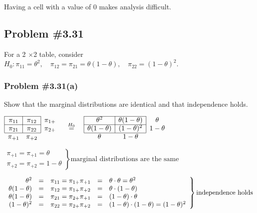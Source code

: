 \documentclass[12pt, letterpaper]{article}
\begin{document}
Having a cell with a value of 0 makes analysis difficult.  

\subsection*{Problem {\#}3.31}
For a 2 $\times$2 table, consider $H_0: \pi_{11} = \theta^2, \quad \pi_{12} = \pi_{21} = \theta(1 - \theta),\quad  \pi_{22} = (1 - \theta)^2$.  
\subsubsection*{Problem {\#}3.31(a)} 
Show that the marginal distributions are identical and that independence holds.  

$\begin{array}{ccc}
\cline{1-2} 
\multicolumn{1}{|c}{\pi_{11}} & \multicolumn{1}{|c|}{\pi_{12}}  & \pi_{1+} \\ \cline{1-2}
\multicolumn{1}{|c}{\pi_{21}} & \multicolumn{1}{|c|}{\pi_{22}}  & \pi_{2+} \\ \cline{1-2}
\pi_{+1} & \pi_{+2} & 
\end{array}
\quad 
\stackrel{H_0}{=}  \quad 
\begin{array}{ccc}
\cline{1-2} 
\multicolumn{1}{|c}{\theta^2} & \multicolumn{1}{|c|}{\theta(1 - \theta)}  & \theta \\ \cline{1-2}
\multicolumn{1}{|c}{\theta(1 - \theta) } & \multicolumn{1}{|c|}{(1- \theta)^2}  & 1 - \theta \\ \cline{1-2}
\theta & 1 - \theta & 
\end{array}$ 

$ \left. 
\begin{array}{l }
\pi_{+1} = \pi_{+1} = \theta \\
\pi_{+2} = \pi_{+2} = 1 - \theta 
\end{array} \right\} \text{marginal distributions are the same}$

$ \left. 
\begin{array}{r c c c l }
\theta^2 &=& \pi_{11} = \pi_{1+} \pi_{+1} &=& \theta \cdot \theta = \theta^2 \\
\theta(1 - \theta) &=& \pi_{12} = \pi_{1+} \pi_{+2} &=& \theta \cdot (1 - \theta) \\
\theta(1 - \theta) &=& \pi_{21} = \pi_{2+} \pi_{+1} &=& (1 - \theta) \cdot \theta  \\
(1 - \theta)^2 &=& \pi_{22} = \pi_{2+} \pi_{+2} &=& (1 - \theta) \cdot (1 - \theta) = (1 - \theta)^2 
\end{array} \right\} \text{independence holds}$
\end{document}
